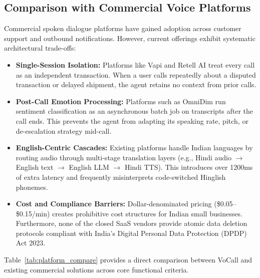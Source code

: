 \documentclass[12pt,a4paper]{article}
\begin{document}
\subsection{Comparison with Commercial Voice Platforms}

Commercial spoken dialogue platforms have gained adoption across customer support and outbound notifications. However, current offerings exhibit systematic architectural trade-offs:

\begin{itemize}[leftmargin=*]
    \item \textbf{Single-Session Isolation:} Platforms like Vapi and Retell AI treat every call as an independent transaction. When a user calls repeatedly about a disputed transaction or delayed shipment, the agent retains no context from prior calls.
    \item \textbf{Post-Call Emotion Processing:} Platforms such as OmniDim run sentiment classification as an asynchronous batch job on transcripts after the call ends. This prevents the agent from adapting its speaking rate, pitch, or de-escalation strategy mid-call.
    \item \textbf{English-Centric Cascades:} Existing platforms handle Indian languages by routing audio through multi-stage translation layers (e.g., Hindi audio $\rightarrow$ English text $\rightarrow$ English LLM $\rightarrow$ Hindi TTS). This introduces over 1200ms of extra latency and frequently misinterprets code-switched Hinglish phonemes.
    \item \textbf{Cost and Compliance Barriers:} Dollar-denominated pricing (\$0.05--\$0.15/min) creates prohibitive cost structures for Indian small businesses. Furthermore, none of the closed SaaS vendors provide atomic data deletion protocols compliant with India's Digital Personal Data Protection (DPDP) Act 2023.
\end{itemize}

Table~\ref{tab:platform_compare} provides a direct comparison between VoCall and existing commercial solutions across core functional criteria.
\end{document}
